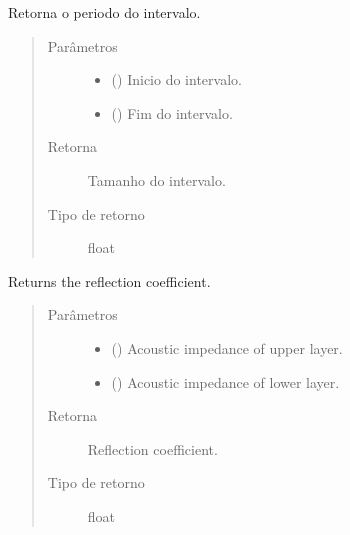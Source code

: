 \documentclass[letterpaper,10pt,brazil]{sphinxmanual}
\begin{document}

\begin{fulllineitems}
\label{\detokenize{source/base:base.period}}
Retorna o periodo do intervalo.
\begin{quote}\begin{description}
\item[{Parâmetros}] \leavevmode\begin{itemize}
\item {} 
 () \textendash{} Inicio do intervalo.

\item {} 
 () \textendash{} Fim do intervalo.

\end{itemize}

\item[{Retorna}] \leavevmode
Tamanho do intervalo.

\item[{Tipo de retorno}] \leavevmode
float

\end{description}\end{quote}

\end{fulllineitems}


\begin{fulllineitems}
\label{\detokenize{source/base:base.reflection_coefficient}}
Returns the reflection coefficient.
\begin{quote}\begin{description}
\item[{Parâmetros}] \leavevmode\begin{itemize}
\item {} 
 () \textendash{} Acoustic impedance of upper layer.

\item {} 
 () \textendash{} Acoustic impedance of lower layer.

\end{itemize}

\item[{Retorna}] \leavevmode
Reflection coefficient.

\item[{Tipo de retorno}] \leavevmode
float

\end{description}\end{quote}

\end{fulllineitems}
\end{document}

